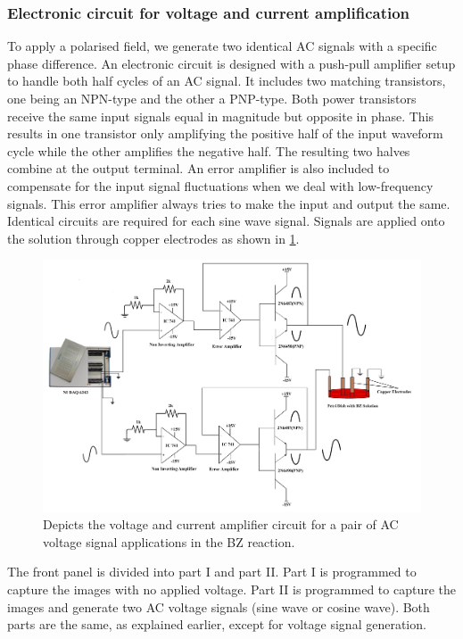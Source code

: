 \documentclass[journal=jacsat,manuscript=article]{achemso}
\begin{document}
\subsubsection{Electronic circuit for voltage and current amplification}
To apply a polarised field, we generate two identical AC signals with
a specific phase difference. An electronic circuit is designed with a
push-pull amplifier setup to handle both half cycles of an AC signal.
It includes two matching transistors, one being an NPN-type and the
other a PNP-type. Both power transistors receive the same input
signals equal in magnitude but opposite in phase. This results in one
transistor only amplifying the positive half of the input waveform
cycle while the other amplifies the negative half. The resulting two
halves combine at the output terminal. An error amplifier is also
included to compensate for the input signal fluctuations when we deal
with low-frequency signals. This error amplifier always tries to make
the input and output the same. Identical circuits are required for
each sine wave signal. Signals are applied onto the solution through
copper electrodes as shown in \ref{fig:ex6}.
\begin{figure}[H]
    \centering
    \includegraphics[width=\linewidth]{CPEF - Copy.jpg}
    \caption{Depicts the voltage and current amplifier circuit for a
      pair of AC voltage signal applications in the BZ reaction.}
    \label{fig:ex6}
\end{figure}
The front panel is divided into part I and part II. Part I is
programmed to capture the images with no applied voltage.  Part II is
programmed to capture the images and generate two AC voltage signals
(sine wave or cosine wave). Both parts are the same, as explained
earlier, except for voltage signal generation. 
\end{document}
